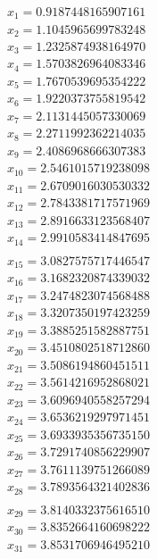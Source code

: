 \begin{multicols}{3}
	\begin{align*}
		x_{1}  = 0.9187448165907161\\
		x_{2}  = 1.1045965699783248\\
		x_{3}  = 1.2325874938164970\\
		x_{4}  = 1.5703826964083346\\
		x_{5}  = 1.7670539695354222\\
		x_{6}  = 1.9220373755819542\\
		x_{7}  = 2.1131445057330069\\
		x_{8}  = 2.2711992362214035\\
		x_{9}  = 2.4086968666307383\\
		x_{10} = 2.5461015719238098\\
		x_{11} = 2.6709016030530332\\
		x_{12} = 2.7843381717571969\\
		x_{13} = 2.8916633123568407\\
		x_{14} = 2.9910583414847695\\
	\end{align*}
	\vfill
	\columnbreak
	\begin{align*}
		x_{15} = 3.0827575717446547\\
		x_{16} = 3.1682320874339032\\
		x_{17} = 3.2474823074568488\\
		x_{18} = 3.3207350197423259\\
		x_{19} = 3.3885251582887751\\
		x_{20} = 3.4510802518712860\\
		x_{21} = 3.5086194860451511\\
		x_{22} = 3.5614216952868021\\
		x_{23} = 3.6096940558257294\\
		x_{24} = 3.6536219297971451\\
		x_{25} = 3.6933935356735150\\
		x_{26} = 3.7291740856229907\\
		x_{27} = 3.7611139751266089\\
		x_{28} = 3.7893564321402836\\
	\end{align*}
	\vfill
	\columnbreak
	\begin{align*}
		x_{29} = 3.8140332375616510\\
		x_{30} = 3.8352664160698222\\
		x_{31} = 3.8531706946495210\\

\end{align*}
\end{multicols}
